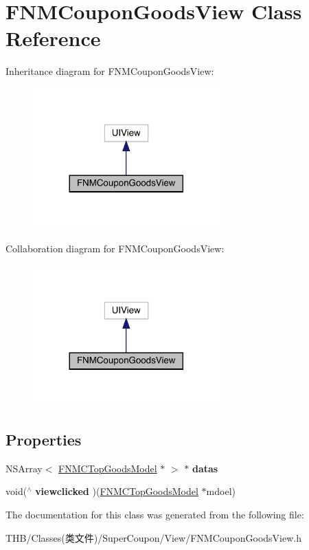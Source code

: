 \hypertarget{interface_f_n_m_coupon_goods_view}{}\section{F\+N\+M\+Coupon\+Goods\+View Class Reference}
\label{interface_f_n_m_coupon_goods_view}


Inheritance diagram for F\+N\+M\+Coupon\+Goods\+View\+:\nopagebreak
\begin{figure}[H]
\begin{center}
\leavevmode
\includegraphics[width=204pt]{interface_f_n_m_coupon_goods_view__inherit__graph}
\end{center}
\end{figure}


Collaboration diagram for F\+N\+M\+Coupon\+Goods\+View\+:\nopagebreak
\begin{figure}[H]
\begin{center}
\leavevmode
\includegraphics[width=204pt]{interface_f_n_m_coupon_goods_view__coll__graph}
\end{center}
\end{figure}
\subsection*{Properties}
\begin{DoxyCompactItemize}
\item 
\mbox{\label{interface_f_n_m_coupon_goods_view_af7559b3ed1fa8538c6d678a5e579f916}} 
N\+S\+Array$<$ \mbox{\hyperlink{interface_f_n_m_c_top_goods_model}{F\+N\+M\+C\+Top\+Goods\+Model}} $\ast$ $>$ $\ast$ {\bfseries datas}
\item 
\mbox{\label{interface_f_n_m_coupon_goods_view_a1da3a9fe0b20d072093b28258c2de8de}} 
void($^\wedge$ {\bfseries viewclicked} )(\mbox{\hyperlink{interface_f_n_m_c_top_goods_model}{F\+N\+M\+C\+Top\+Goods\+Model}} $\ast$mdoel)
\end{DoxyCompactItemize}


The documentation for this class was generated from the following file\+:\begin{DoxyCompactItemize}
\item 
T\+H\+B/\+Classes(类文件)/\+Super\+Coupon/\+View/F\+N\+M\+Coupon\+Goods\+View.\+h\end{DoxyCompactItemize}
